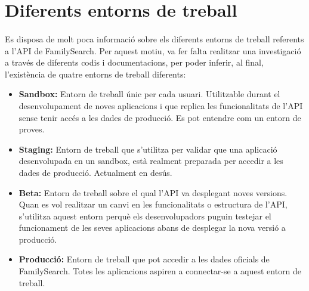 \section{Diferents entorns de treball}

    \paragraph{}
    Es disposa de molt poca informació sobre els diferents entorns de treball referents a l'API de FamilySearch. Per aquest motiu, va fer falta realitzar una investigació a través de diferents codis i documentacions, per poder inferir, al final, l'existència de quatre entorns de treball diferents:

    \begin{itemize}
        \item \textbf{Sandbox:} Entorn de treball únic per cada usuari. Utilitzable durant el desenvolupament de noves aplicacions i que replica les funcionalitats de l'API sense tenir accés a les dades de producció. Es pot entendre com un entorn de proves.
        \item \textbf{Staging:} Entorn de treball que s'utilitza per validar que una aplicació desenvolupada en un sandbox, està realment preparada per accedir a les dades de producció. Actualment en desús.
        \item \textbf{Beta:} Entorn de treball sobre el qual l'API va desplegant noves versions. Quan es vol realitzar un canvi en les funcionalitats o estructura de l'API, s'utilitza aquest entorn perquè els desenvolupadors puguin testejar el funcionament de les seves aplicacions abans de desplegar la nova versió a producció.
        \item \textbf{Producció:} Entorn de treball que pot accedir a les dades oficials de FamilySearch. Totes les aplicacions aspiren a connectar-se a aquest entorn de treball.
    \end{itemize}
